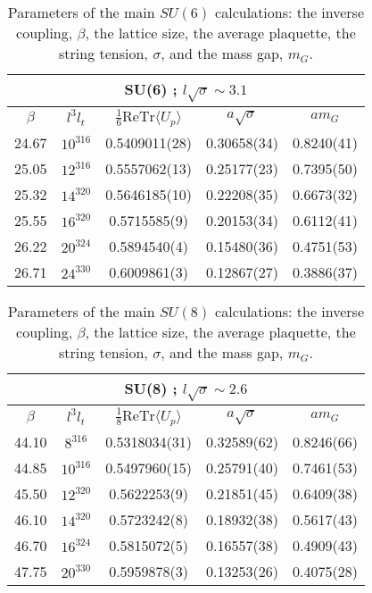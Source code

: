 \documentclass[12pt]{article}
\begin{document}
\begin{table}[htb]
\centering
\begin{tabular}{|cc|ccc|} \hline
\multicolumn{5}{|c|}{SU(6) ; $l\surd\sigma\sim 3.1$} \\ \hline
$\beta$ & $l^3l_t$ & $\tfrac{1}{6}\text{ReTr}\langle U_p\rangle$ & 
$a\surd\sigma$ & $am_G$  \\ \hline
24.67    & $10^316$  & 0.5409011(28)  & 0.30658(34)  & 0.8240(41)  \\
25.05    & $12^316$  & 0.5557062(13)  & 0.25177(23)  & 0.7395(50)  \\
25.32    & $14^320$  & 0.5646185(10)  & 0.22208(35)  & 0.6673(32)  \\
25.55    & $16^320$  & 0.5715585(9)   & 0.20153(34)  & 0.6112(41)  \\
26.22    & $20^324$  & 0.5894540(4)   & 0.15480(36)  & 0.4751(53)  \\
26.71    & $24^330$  & 0.6009861(3)   & 0.12867(27)  & 0.3886(37)  \\ \hline
\end{tabular}
\caption{Parameters of the main $SU(6)$ calculations: the inverse coupling, $\beta$, the lattice size, the
  average plaquette, the string tension, $\sigma$, and the  mass gap, $m_G$.}
\label{table_param_SU6}
\end{table}




\begin{table}[htb]
\centering
\begin{tabular}{|cc|ccc|} \hline
\multicolumn{5}{|c|}{SU(8) ; $l\surd\sigma\sim 2.6$} \\ \hline
 $\beta$ & $l^3l_t$ & $\tfrac{1}{8}\text{ReTr}\langle U_p\rangle$ & 
$a\surd\sigma$ & $am_G$  \\ \hline
44.10  & $8^316$   & 0.5318034(31) & 0.32589(62)  & 0.8246(66)  \\
44.85  & $10^316$  & 0.5497960(15) & 0.25791(40)  & 0.7461(53)  \\
45.50  & $12^320$  & 0.5622253(9)  & 0.21851(45)  & 0.6409(38)  \\
46.10  & $14^320$  & 0.5723242(8)  & 0.18932(38)  & 0.5617(43)  \\
46.70  & $16^324$  & 0.5815072(5)  & 0.16557(38)  & 0.4909(43)  \\
47.75  & $20^330$  & 0.5959878(3)  & 0.13253(26)  & 0.4075(28)  \\ \hline
\end{tabular}
\caption{Parameters of the main $SU(8)$ calculations: the inverse coupling, $\beta$, the lattice size, the
  average plaquette, the string tension, $\sigma$, and the  mass gap, $m_G$.}
\label{table_param_SU8}
\end{table}
\end{document}
